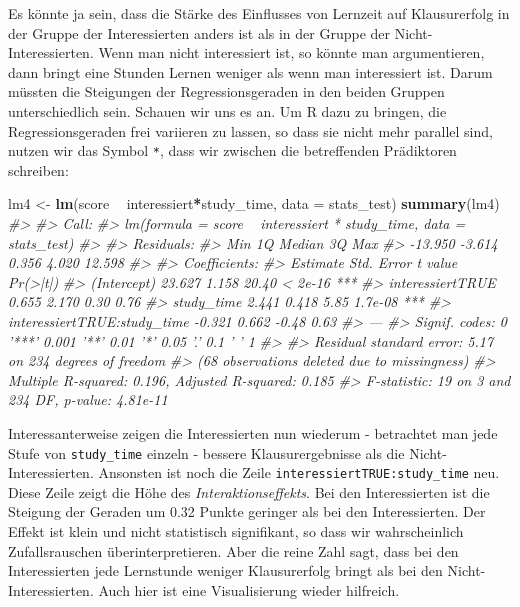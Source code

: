 \documentclass[12pt,ngerman,]{book}
\makeatletter
\newenvironment{Shaded}{\begin{snugshade}}{\end{snugshade}}
\newcommand{\KeywordTok}[1]{\textcolor[rgb]{0.13,0.29,0.53}{\textbf{#1}}}
\newcommand{\DataTypeTok}[1]{\textcolor[rgb]{0.13,0.29,0.53}{#1}}
\newcommand{\StringTok}[1]{\textcolor[rgb]{0.31,0.60,0.02}{#1}}
\newcommand{\CommentTok}[1]{\textcolor[rgb]{0.56,0.35,0.01}{\textit{#1}}}
\newcommand{\OperatorTok}[1]{\textcolor[rgb]{0.81,0.36,0.00}{\textbf{#1}}}
\newcommand{\NormalTok}[1]{#1}
\newenvironment{kframe}{%
\medskip{}
\setlength{\fboxsep}{.8em}
 \def\at@end@of@kframe{}%
 \ifinner\ifhmode%
  \def\at@end@of@kframe{\end{minipage}}%
  \begin{minipage}{\columnwidth}%
 \fi\fi%
 \def\FrameCommand##1{\hskip\@totalleftmargin \hskip-\fboxsep
 \colorbox{shadecolor}{##1}\hskip-\fboxsep
     \hskip-\linewidth \hskip-\@totalleftmargin \hskip\columnwidth}%
 \MakeFramed {\advance\hsize-\width
   \@totalleftmargin\z@ \linewidth\hsize
   \@setminipage}}%
 {\par\unskip\endMakeFramed%
 \at@end@of@kframe}
\renewenvironment{Shaded}{\begin{kframe}}{\end{kframe}}
\theoremstyle{definition}
\theoremstyle{definition}
\theoremstyle{remark}
\makeatother
\begin{document}
Es könnte ja sein, dass die Stärke des Einflusses von Lernzeit auf
Klausurerfolg in der Gruppe der Interessierten anders ist als in der
Gruppe der Nicht-Interessierten. Wenn man nicht interessiert ist, so
könnte man argumentieren, dann bringt eine Stunden Lernen weniger als
wenn man interessiert ist. Darum müssten die Steigungen der
Regressionsgeraden in den beiden Gruppen unterschiedlich sein. Schauen
wir uns es an. Um R dazu zu bringen, die Regressionsgeraden frei
variieren zu lassen, so dass sie nicht mehr parallel sind, nutzen wir
das Symbol \texttt{*}, dass wir zwischen die betreffenden Prädiktoren
schreiben:

\begin{Shaded}
\begin{Highlighting}[]
\NormalTok{lm4 <-}\StringTok{ }\KeywordTok{lm}\NormalTok{(score }\OperatorTok{~}\StringTok{ }\NormalTok{interessiert}\OperatorTok{*}\NormalTok{study_time, }\DataTypeTok{data =}\NormalTok{ stats_test)}
\KeywordTok{summary}\NormalTok{(lm4)}
\CommentTok{#> }
\CommentTok{#> Call:}
\CommentTok{#> lm(formula = score ~ interessiert * study_time, data = stats_test)}
\CommentTok{#> }
\CommentTok{#> Residuals:}
\CommentTok{#>     Min      1Q  Median      3Q     Max }
\CommentTok{#> -13.950  -3.614   0.356   4.020  12.598 }
\CommentTok{#> }
\CommentTok{#> Coefficients:}
\CommentTok{#>                             Estimate Std. Error t value Pr(>|t|)    }
\CommentTok{#> (Intercept)                   23.627      1.158   20.40  < 2e-16 ***}
\CommentTok{#> interessiertTRUE               0.655      2.170    0.30     0.76    }
\CommentTok{#> study_time                     2.441      0.418    5.85  1.7e-08 ***}
\CommentTok{#> interessiertTRUE:study_time   -0.321      0.662   -0.48     0.63    }
\CommentTok{#> ---}
\CommentTok{#> Signif. codes:  0 '***' 0.001 '**' 0.01 '*' 0.05 '.' 0.1 ' ' 1}
\CommentTok{#> }
\CommentTok{#> Residual standard error: 5.17 on 234 degrees of freedom}
\CommentTok{#>   (68 observations deleted due to missingness)}
\CommentTok{#> Multiple R-squared:  0.196,  Adjusted R-squared:  0.185 }
\CommentTok{#> F-statistic:   19 on 3 and 234 DF,  p-value: 4.81e-11}
\end{Highlighting}
\end{Shaded}

Interessanterweise zeigen die Interessierten nun wiederum - betrachtet
man jede Stufe von \texttt{study\_time} einzeln - bessere
Klausurergebnisse als die Nicht-Interessierten. Ansonsten ist noch die
Zeile \texttt{interessiertTRUE:study\_time} neu. Diese Zeile zeigt die
Höhe des \emph{Interaktionseffekts}. Bei den
Interessierten ist die Steigung der Geraden um 0.32 Punkte geringer als
bei den Interessierten. Der Effekt ist klein und nicht statistisch
signifikant, so dass wir wahrscheinlich Zufallsrauschen
überinterpretieren. Aber die reine Zahl sagt, dass bei den
Interessierten jede Lernstunde weniger Klausurerfolg bringt als bei den
Nicht-Interessierten. Auch hier ist eine Visualisierung wieder
hilfreich.
\end{document}
